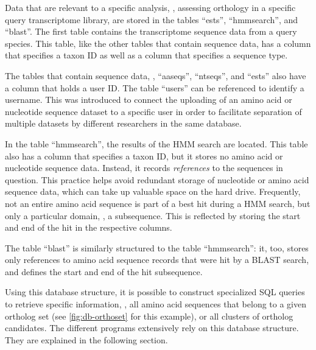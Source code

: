 Data that are relevant to a specific analysis, \eg, assessing orthology in a
specific query transcriptome library, are stored in the tables ``ests'',
``hmmsearch'', and ``blast''.  The first table contains the transcriptome
sequence data from a query species.  This table, like the other tables that
contain sequence data, has a column that specifies a taxon ID as well as a
column that specifies a sequence type.



The tables that contain sequence data, \ie, ``aaseqs'', ``ntseqs'', and ``ests''
also have a column that holds a user ID. The table ``users'' can be referenced
to identify a username. This was introduced to connect the uploading of an amino
acid or nucleotide sequence dataset to a specific user in order to facilitate
separation of multiple datasets by different researchers in the same database.

In the table ``hmmsearch'', the results of the HMM search are located. This
table also has a column that specifies a taxon ID, but it stores no amino acid
or nucleotide sequence data. Instead, it records \emph{references} to the
sequences in question. This practice helps avoid redundant storage of nucleotide
or amino acid sequence data, which can take up valuable space on the hard drive.
Frequently, not an entire amino acid sequence is part of a best hit during a HMM
search, but only a particular domain, \ie, a subsequence. This is reflected by
storing the start and end of the hit in the respective columns. 

The table ``blast'' is similarly structured to the table ``hmmsearch'': it, too,
stores only references to amino acid sequence records that were hit by a BLAST
search, and defines the start and end of the hit subsequence.

Using this database structure, it is possible to construct specialized SQL
queries to retrieve specific information, \eg, all amino acid sequences that
belong to a given ortholog set (see \autoref{fig:db-orthoset} for this example),
or all clusters of ortholog candidates. The different \pname programs
extensively rely on this database structure. They are explained in the following
section.



